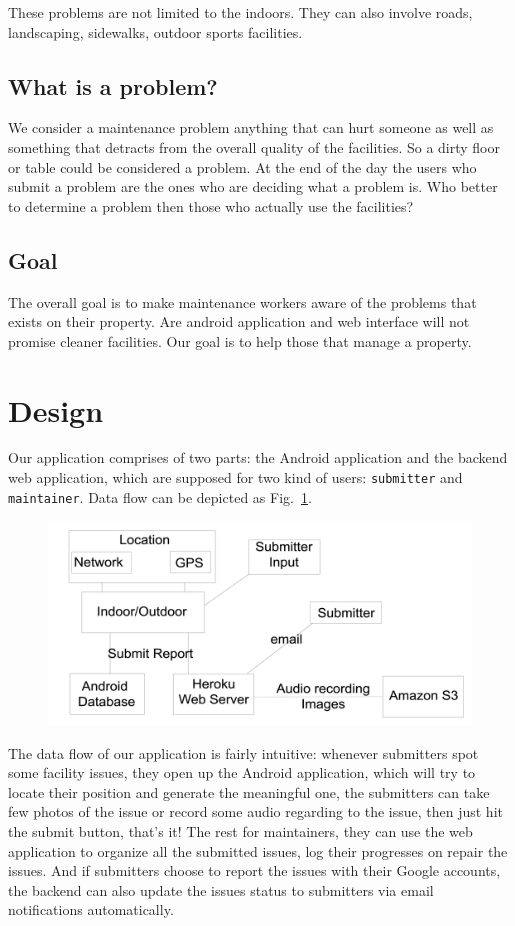 \documentclass{acm_proc_article-sp}
\begin{document}
These problems are not limited to the indoors. They can also involve roads, landscaping, sidewalks, outdoor sports facilities.

\subsection{What is a problem?}
We consider a maintenance problem anything that can hurt someone as well as something that detracts from the overall quality of the facilities. 
So a dirty floor or table could be considered a problem. 
At the end of the day the users who submit a problem are the ones who are deciding what a problem is. 
Who better to determine a problem then those who actually use the facilities?

\subsection{Goal}
The overall goal is to make maintenance workers aware of the problems that exists on their property. 
Are android application and web interface will not promise cleaner facilities. Our goal is to help those that manage a property.

\section{Design}
Our application comprises of two parts: the Android application and the backend web application, which are supposed for two kind of users:
\texttt{submitter} and \texttt{maintainer}. Data flow can be depicted as Fig.~\ref{fig:diagram}.
\begin{figure}
\centering
\includegraphics[scale=0.1]{images/diagram.png}
\caption{}\label{fig:diagram}
\end{figure}
The data flow of our application is fairly intuitive: whenever submitters spot some facility issues, they open up the Android application, which will
try to locate their position and generate the meaningful one, the submitters can take few photos of the issue or record some audio regarding to
the issue, then just hit the submit button, that's it! The rest for maintainers, they can use the web application to organize all the submitted issues,
log their progresses on repair the issues. And if submitters choose to report the issues with their Google accounts, the backend can also update
the issues status to submitters via email notifications automatically.
\end{document}
